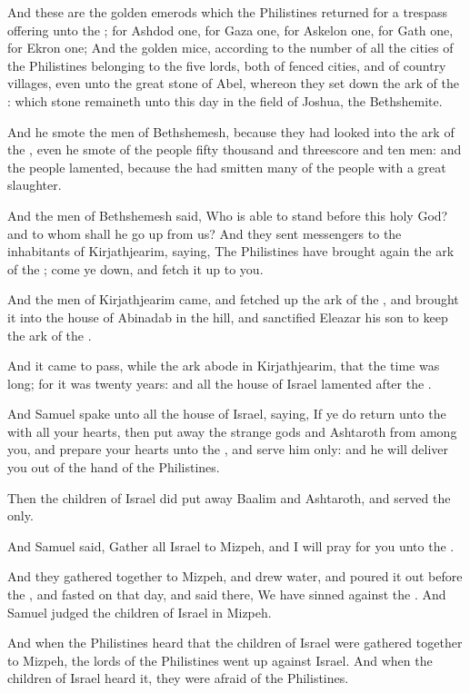 \Verse And these are the golden emerods which the Philistines returned for a trespass offering unto the \LORD; for Ashdod one, for Gaza one, for Askelon one, for Gath one, for Ekron one; \Verse And the golden mice, according to the number of all the cities of the Philistines belonging to the five lords, both of fenced cities, and of country villages, even unto the great stone of Abel, whereon they set down the ark of the \LORD: which stone remaineth unto this day in the field of Joshua, the Bethshemite.

\Verse And he smote the men of Bethshemesh, because they had looked into the ark of the \LORD, even he smote of the people fifty thousand and threescore and ten men: and the people lamented, because the \LORD had smitten many of the people with a great slaughter.

\Verse And the men of Bethshemesh said, Who is able to stand before this holy \LORD God? and to whom shall he go up from us?  \Verse And they sent messengers to the inhabitants of Kirjathjearim, saying, The Philistines have brought again the ark of the \LORD; come ye down, and fetch it up to you.


\Chapter
\Verse And the men of Kirjathjearim came, and fetched up the ark of the \LORD, and brought it into the house of Abinadab in the hill, and sanctified Eleazar his son to keep the ark of the \LORD.

\Verse And it came to pass, while the ark abode in Kirjathjearim, that the time was long; for it was twenty years: and all the house of Israel lamented after the \LORD.

\Verse And Samuel spake unto all the house of Israel, saying, If ye do return unto the \LORD with all your hearts, then put away the strange gods and Ashtaroth from among you, and prepare your hearts unto the \LORD, and serve him only: and he will deliver you out of the hand of the Philistines.

\Verse Then the children of Israel did put away Baalim and Ashtaroth, and served the \LORD only.

\Verse And Samuel said, Gather all Israel to Mizpeh, and I will pray for you unto the \LORD.

\Verse And they gathered together to Mizpeh, and drew water, and poured it out before the \LORD, and fasted on that day, and said there, We have sinned against the \LORD. And Samuel judged the children of Israel in Mizpeh.

\Verse And when the Philistines heard that the children of Israel were gathered together to Mizpeh, the lords of the Philistines went up against Israel. And when the children of Israel heard it, they were afraid of the Philistines.

